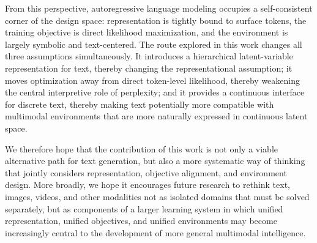From this perspective, autoregressive language modeling occupies a self-consistent corner of the design space: representation is tightly bound to surface tokens, the training objective is direct likelihood maximization, and the environment is largely symbolic and text-centered. The route explored in this work changes all three assumptions simultaneously. It introduces a hierarchical latent-variable representation for text, thereby changing the representational assumption; it moves optimization away from direct token-level likelihood, thereby weakening the central interpretive role of perplexity; and it provides a continuous interface for discrete text, thereby making text potentially more compatible with multimodal environments that are more naturally expressed in continuous latent space.

We therefore hope that the contribution of this work is not only a viable alternative path for text generation, but also a more systematic way of thinking that jointly considers representation, objective alignment, and environment design. More broadly, we hope it encourages future research to rethink text, images, videos, and other modalities not as isolated domains that must be solved separately, but as components of a larger learning system in which unified representation, unified objectives, and unified environments may become increasingly central to the development of more general multimodal intelligence.